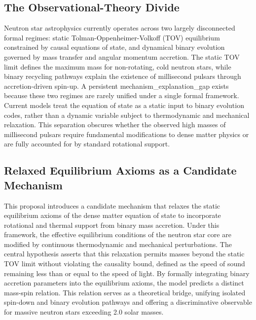 \documentclass[conference]{IEEEtran}
\begin{document}
\subsection{The Observational-Theory Divide}
Neutron star astrophysics currently operates across two largely disconnected formal regimes: static Tolman-Oppenheimer-Volkoff (TOV) equilibrium constrained by causal equations of state, and dynamical binary evolution governed by mass transfer and angular momentum accretion. The static TOV limit defines the maximum mass for non-rotating, cold neutron stars, while binary recycling pathways explain the existence of millisecond pulsars through accretion-driven spin-up. A persistent mechanism\_explanation\_gap exists because these two regimes are rarely unified under a single formal framework. Current models treat the equation of state as a static input to binary evolution codes, rather than a dynamic variable subject to thermodynamic and mechanical relaxation. This separation obscures whether the observed high masses of millisecond pulsars require fundamental modifications to dense matter physics or are fully accounted for by standard rotational support.~\cite{cite_55957f4ce67bd972,cite_7e1f0038b29c01f3}

\subsection{Relaxed Equilibrium Axioms as a Candidate Mechanism}
This proposal introduces a candidate mechanism that relaxes the static equilibrium axioms of the dense matter equation of state to incorporate rotational and thermal support from binary mass accretion. Under this framework, the effective equilibrium conditions of the neutron star core are modified by continuous thermodynamic and mechanical perturbations. The central hypothesis asserts that this relaxation permits masses beyond the static TOV limit without violating the causality bound, defined as the speed of sound remaining less than or equal to the speed of light. By formally integrating binary accretion parameters into the equilibrium axioms, the model predicts a distinct mass-spin relation. This relation serves as a theoretical bridge, unifying isolated spin-down and binary evolution pathways and offering a discriminative observable for massive neutron stars exceeding 2.0 solar masses.
\end{document}
